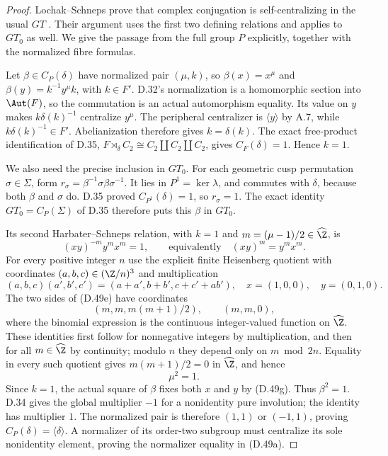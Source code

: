 \begin{proof}
Lochak--Schneps prove that complex conjugation is
self-centralizing in the usual $GT$
\cite[Proposition 4(ii), with Lemma 9]{R-LS}.
Their argument uses the first two defining relations
and applies to $GT_0$ as well.  We give the passage
from the full group $P$ explicitly, together with
the normalized fibre formulas.

Let $\beta\in C_P(\delta)$ have normalized pair
$(\mu,k)$, so
$\beta(x)=x^\mu$ and $\beta(y)=k^{-1}y^\mu k$,
with $k\in F'$.
D.32's normalization is a homomorphic section
into $\Aut(F)$, so the commutation is an actual
automorphism equality.
Its value on $y$ makes $k\delta(k)^{-1}$
centralize $y^\mu$.
The peripheral centralizer is $\langle y\rangle$
by A.7, while $k\delta(k)^{-1}\in F'$.
Abelianization therefore gives $k=\delta(k)$.
The exact free-product identification of D.35,
$F\rtimes_\delta C_2\cong C_2\amalg C_2\amalg C_2$,
gives $C_F(\delta)=1$.  Hence $k=1$.

We also need the precise inclusion in $GT_0$.
For each geometric cusp permutation $\sigma\in\Sigma$,
form $r_\sigma=\beta^{-1}\sigma\beta\sigma^{-1}$.
It lies in $P^1=\ker\lambda$, and commutes with
$\delta$, because both $\beta$ and $\sigma$ do.
D.35 proved $C_{P^1}(\delta)=1$, so $r_\sigma=1$.
The exact identity $GT_0=C_P(\Sigma)$ of D.35
therefore puts this $\beta$ in $GT_0$.

Its second Harbater--Schneps relation, with
$k=1$ and $m=(\mu-1)/2\in\widehat\Z$, is
\[
                (xy)^{-m}y^m x^m=1,
       \qquad\text{equivalently}\quad
                         (xy)^m=y^m x^m.                \tag{D.49e}
\]
For every positive integer $n$ use the explicit
finite Heisenberg quotient with coordinates
$(a,b,c)\in(\Z/n)^3$ and multiplication
\[
 (a,b,c)(a',b',c')=(a+a',b+b',c+c'+ab'),
       \quad x=(1,0,0),\quad y=(0,1,0).
\]
The two sides of (D.49e) have coordinates
\[
 (m,m,m(m+1)/2),\qquad(m,m,0),
                                                        \tag{D.49f}
\]
where the binomial expression is the continuous
integer-valued function on $\widehat\Z$.
These identities first follow for nonnegative
integers by multiplication, and then for all
$m\in\widehat\Z$ by continuity; modulo $n$ they
depend only on $m\bmod2n$.
Equality in every such quotient gives
$m(m+1)/2=0$ in $\widehat\Z$, and hence
\[
                           \mu^2=1.                     \tag{D.49g}
\]
Since $k=1$, the actual square of $\beta$ fixes
both $x$ and $y$ by (D.49g).  Thus $\beta^2=1$.
D.34 gives the global multiplier $-1$ for a
nonidentity pure involution; the identity has
multiplier $1$.
The normalized pair is therefore $(1,1)$ or
$(-1,1)$, proving $C_P(\delta)=\langle\delta\rangle$.
A normalizer of its order-two subgroup must
centralize its sole nonidentity element, proving
the normalizer equality in (D.49a).


\end{proof}
